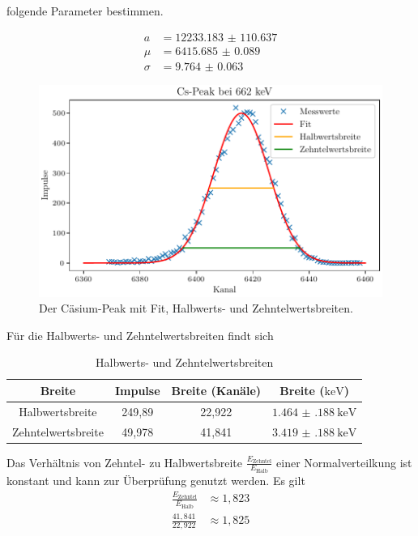 folgende Parameter bestimmen.

\begin{align}
    a &= \num{12233.183(110637)} \\
    \mu &= \num{6415.685(89)} \\
    \sigma &= \num{9.764(63)}
\end{align}

\begin{figure}[H]
    \centering
    \includegraphics[width=\textwidth]{plots/CsPeak.pdf}
    \caption{Der Cäsium-Peak mit Fit, Halbwerts- und Zehntelwertsbreiten.}
    \label{fig:cspeak}
\end{figure}

Für die Halbwerts- und Zehntelwertsbreiten findt sich
\begin{table}[H]
    \centering
    \caption{Halbwerts- und Zehntelwertsbreiten}
    \label{tab:breiten}
    \begin{tabular}{c c c c}
        \toprule
        {Breite} & {Impulse} & {Breite (Kanäle)} & {Breite ($\si{\kilo\electronvolt}$)} \\
        \midrule
        Halbwertsbreite & 249,89 & 22,922 & $\qty{1.464(188)}{\kilo\electronvolt}$ \\
        Zehntelwertsbreite & 49,978 & 41,841 & $\qty{3.419(188)}{\kilo\electronvolt}$ \\
        \bottomrule
    \end{tabular}
\end{table}

Das Verhältnis von Zehntel- zu Halbwertsbreite $\frac{E_\text{Zehntel}}{E_\text{Halb}}$  einer Normalverteilkung ist konstant und kann zur Überprüfung genutzt werden. Es gilt
\begin{align}
        \frac{E_\text{Zehntel}}{E_\text{Halb}} &\approx  1,823 \\
        \frac{41,841}{22,922} &\approx 1,825
\end{align}

